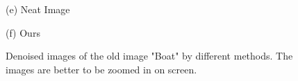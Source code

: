 \documentclass[runningheads]{llncs}
\begin{document}
\begin{figure}
{\begin{minipage}[t]{0.33\textwidth}
{\footnotesize (e) Neat Image}
\end{minipage}
\begin{minipage}[t]{0.33\textwidth}
\centering
{}
{\footnotesize (f) Ours }
\end{minipage}
}
\caption{Denoised images of the old image "Boat" by different methods. The images are better to be zoomed in on screen.}
\label{fig20}
\end{figure}
\end{document}
